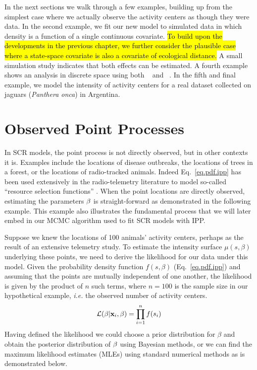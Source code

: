 In the next sections we walk through a few examples, building up from
the simplest case where we actually observe the activity centers as
though they were data. In the second example, we fit our new model to simulated
data in which density is a function of a single continuous
covariate. \hl{To build upon the developments in the previous chapter, we
further consider the plausible case where a state-space covariate is also a
covariate of ecological distance.} A small simulation study indicates
that both effects can be estimated. A fourth example shows an analysis in discrete space using
both \secr~\citep{efford:2011} and \jags~\citep{plummer:2003}. In the
fifth and final example, we model the intensity of
activity centers for a real dataset collected on jaguars
(\emph{Panthera onca}) in Argentina.

\section{Observed Point Processes}

In SCR models, the point process is not directly observed, but in
other contexts it is. Examples include the locations of disease
outbreaks, the locations of trees in a forest, or the locations of
radio-tracked animals. Indeed Eq.~\ref{eq.pdf.ipp} has been used
extensively in the radio-telemetry literature to model so-called
``resource selection functions'' \citep{manly_etal:2002,lele_keim:2006}.
When the point locations are directly observed,
estimating the parameters $\bf \beta$ is straight-forward as
demonstrated in the following example. This example also illustrates
the fundamental process that we will later embed in our MCMC algorithm
used to fit SCR models with IPP.

Suppose we knew the locations of 100 animals' activity
centers, perhaps as the result of an extensive telemetry study. To
estimate the intensity surface $\mu(s, \beta)$ underlying these
points, we need to derive the likelihood for our data under this
model. Given the probability density function $f(s, \beta)$
(Eq.~\ref{eq.pdf.ipp}) and assuming that the points are
mutually independent of one another,
the likelihood is given by the product
of $n$ such terms, where $n=100$ is the sample size in our
hypothetical example,
\emph{i.e.} the observed number of activity centers.
\[
\mathcal{L}({\bf \beta} | {\bf x}_i, \beta) = \prod_{i=1}^n f(s_i)
\]
Having defined the likelihood we could choose a prior distribution for
$\beta$ and obtain the posterior distribution of
$\bf \beta$ using Bayesian methods, or we can find the maximum likelihood
estimates (MLEs) using standard numerical methods as is demonstrated
below.


